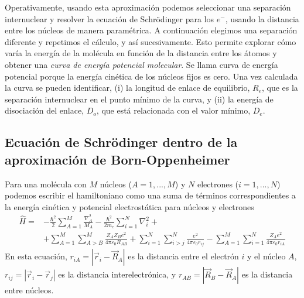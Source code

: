 Operativamente, usando esta aproximación podemos seleccionar
una separación internuclear y resolver la ecuación de
Schrödinger para los $e^-$, usando la distancia entre los
núcleos de manera paramétrica. A continuación elegimos 
una separación diferente y repetimos el cálculo, y así
sucesivamente. Esto permite explorar cómo varía la energía 
de la molécula en función de la distancia entre los átomos
y obtener una \textit{curva de energía potencial molecular}.
Se llama curva de energía potencial porque la energía cinética
de los núcleos fijos es cero. Una vez calculada la curva se
pueden identificar, (i) la longitud de enlace de equilibrio,
$R_e$, que es la separación internuclear en el punto mínimo de
la curva, y (ii) la energía de disociación del enlace, $D_o$,
que está relacionada con el valor mínimo, $D_e$.

\subsection{Ecuación de Schrödinger dentro de la 
aproximación de Born-Oppenheimer}
Para una molécula con $M$ núcleos ($A=1,...,M$) y 
$N$ electrones ($i=1,...,N$) podemos escribir el hamiltoniano
como una suma de términos correspondientes a la energía cinética
y potencial electrostática para núcleos y electrones
\begin{equation}
 \begin{split}  
\hat{H}=& -\frac{\hbar^2}{2}\sum_{A=1}^M\frac{\nabla^2_A}{M_A}
    -\frac{\hbar^2}{2m_e}\sum_{i=1}^N\nabla^2_i
    +\\
&+\sum_{A=1}^M\sum_{A>B}^M\frac{Z_AZ_Be^2}{4\pi\varepsilon_0R_{AB}}
+\sum_{i=1}^N\sum_{i>j}^N \frac{e^2}{4\pi\varepsilon_0r_{ij}}
-\sum_{A=1}^M\sum_{i=1}^{N}\frac{Z_Ae^2}{4\pi\varepsilon_0r_{iA}}
\end{split}
\end{equation}
En esta ecuación, $r_{iA}=|\vec{r}_i-\vec{R}_A|$ es la distancia
entre el electrón $i$ y el núcleo $A$, $r_{ij}=|\vec{r}_i-\vec{r}_j|$ 
es la distancia interelectrónica, y $r_{AB}=|\vec{R}_B-\vec{R}_A|$
es la distancia entre núcleos.


